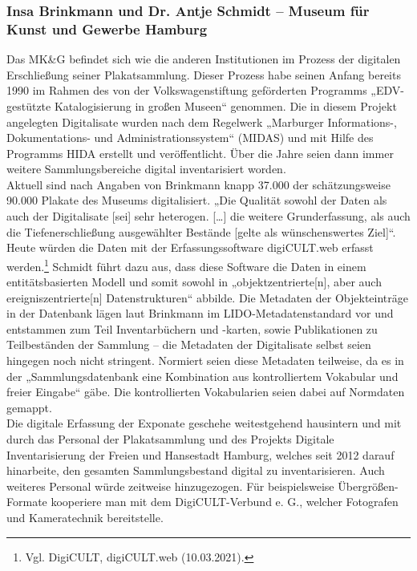 \documentclass[a4paper,12pt,ngerman]{article}
\begin{document}
\subsubsection{Insa Brinkmann und Dr. Antje Schmidt -- Museum für Kunst und Gewerbe Hamburg}
Das MK\&G befindet sich wie die anderen Institutionen im Prozess der digitalen Erschließung seiner Plakatsammlung. Dieser Prozess habe seinen Anfang bereits 1990 im Rahmen des von der Volkswagenstiftung geförderten Programms „EDV-gestützte Katalogisierung in großen Museen“ genommen. Die in diesem Projekt angelegten Digitalisate wurden nach dem Regelwerk „Marburger Informations-, Dokumentations- und Administrationssystem“ (MIDAS) und mit Hilfe des Programms HIDA erstellt und veröffentlicht. Über die Jahre seien dann immer weitere Sammlungsbereiche digital inventarisiert worden. \\
Aktuell sind nach Angaben von Brinkmann knapp 37.000 der schätzungsweise 90.000 Plakate des Museums digitalisiert. „Die Qualität sowohl der Daten als auch der Digitalisate [sei] sehr heterogen. […] die weitere Grunderfassung, als auch die Tiefenerschließung ausgewählter Bestände [gelte als wünschenswertes Ziel]“. \\
Heute würden die Daten mit der Erfassungssoftware digiCULT.web erfasst werden.\footnote{Vgl. DigiCULT, digiCULT.web (10.03.2021).}  Schmidt führt dazu aus, dass diese Software die Daten in einem entitätsbasierten Modell und somit sowohl in „objektzentrierte[n], aber auch ereigniszentrierte[n] Datenstrukturen“ abbilde. Die Metadaten der Objekteinträge in der Datenbank lägen laut Brinkmann im LIDO-Metadatenstandard vor und entstammen zum Teil Inventarbüchern und -karten, sowie Publikationen zu Teilbeständen der Sammlung -- die Metadaten der Digitalisate selbst seien hingegen noch nicht stringent. Normiert seien diese Metadaten teilweise, da es in der „Sammlungsdatenbank eine Kombination aus kontrolliertem Vokabular und freier Eingabe“ gäbe. Die kontrollierten Vokabularien seien dabei auf Normdaten gemappt. \\
Die digitale Erfassung der Exponate geschehe weitestgehend hausintern und mit durch das Personal der Plakatsammlung und des Projekts Digitale Inventarisierung der Freien und Hansestadt Hamburg, welches seit 2012 darauf hinarbeite, den gesamten Sammlungsbestand digital zu inventarisieren. Auch weiteres Personal würde zeitweise hinzugezogen. Für beispielsweise Übergrößen-Formate kooperiere man mit dem DigiCULT-Verbund e. G., welcher Fotografen und Kameratechnik bereitstelle. \\
\end{document}

